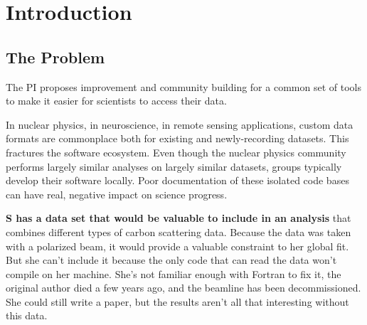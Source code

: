 
\section{Introduction}\label{sec:overview}

\subsection{The Problem}
The PI proposes improvement and community building for a common set of tools to make it easier for scientists to access their data.

In nuclear physics, in neuroscience, in remote sensing applications, custom data formats are commonplace both for existing and newly-recording datasets.  This fractures the software ecosystem.  Even though the nuclear physics community performs largely similar analyses on largely similar datasets, groups typically develop their software locally.  Poor documentation of these isolated code bases can have real, negative impact on science progress. 
 



\textbf{S has a data set that would be valuable to include in an analysis} that combines different types of carbon scattering data.  Because the data was taken with a polarized beam, it would provide a valuable constraint to her global fit.  But she can't include it because the only code that can read the data won't compile on her machine.  She's not familiar enough with Fortran to fix it, the original author died a few years ago, and the beamline has been decommissioned.  She could still write a paper, but the results aren't all that interesting without this data. 
 
